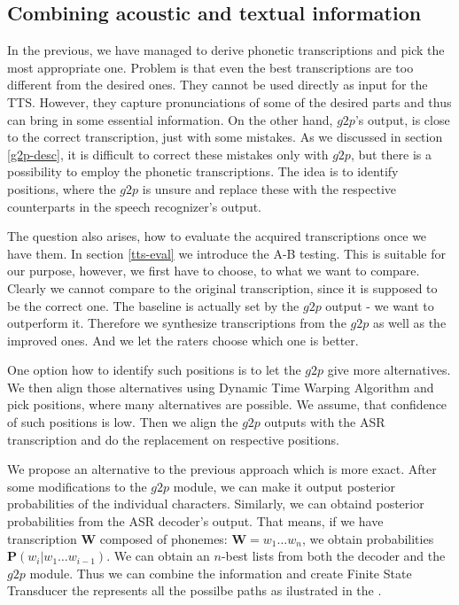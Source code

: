 \subsection{Combining acoustic and textual information}
\label{combine}
In the previous, we have managed to derive phonetic transcriptions and pick the most appropriate one.
Problem is that even the best transcriptions are too different from the desired ones.
They cannot be used directly as input for the TTS.
However, they capture pronunciations of some of the desired parts and thus can bring in some essential information.
On the other hand, $g2p$'s output, is close to the correct transcription, just with some mistakes.
As we discussed in section \ref{g2p-desc}, it is difficult to correct these mistakes only with $g2p$, but there is a possibility to employ the phonetic transcriptions.
The idea is to identify positions, where the $g2p$ is unsure and replace these with the respective counterparts in the speech recognizer's output.
\par
The question also arises, how to evaluate the acquired transcriptions once we have them.
In section \ref{tts-eval} we introduce the A-B testing.
This is suitable for our purpose, however, we first have to choose, to what we want to compare.
Clearly we cannot compare to the original transcription, since it is supposed to be the correct one.
The baseline is actually set by the $g2p$ output - we want to outperform it.
Therefore we synthesize transcriptions from the $g2p$ as well as the improved ones. And we let the raters choose which one is better.
\par
One option how to identify such positions is to let the $g2p$ give more alternatives.
We then align those alternatives using Dynamic Time Warping Algorithm and pick positions, where many alternatives are possible.
We assume, that confidence of such positions is low.
Then we align the $g2p$ outputs with the ASR transcription and do the replacement on respective positions.
\par
We propose an alternative to the previous approach which is more exact.
After some modifications to the $g2p$ module, we can make it output posterior probabilities of the individual characters.
Similarly, we can obtaind posterior probabilities from the ASR decoder's output.
That means, if we have transcription $\mathbf{W}$ composed of phonemes:
$\mathbf{W} = w_1\dots w_n$, we obtain probabilities $\mathbf{P}(w_i \vert w_1 \dots w_{i-1})$.
We can obtain an $n$-best lists from both the decoder and the $g2p$ module.
Thus we can combine the information and create Finite State Transducer the represents all the possilbe paths as ilustrated in the .
